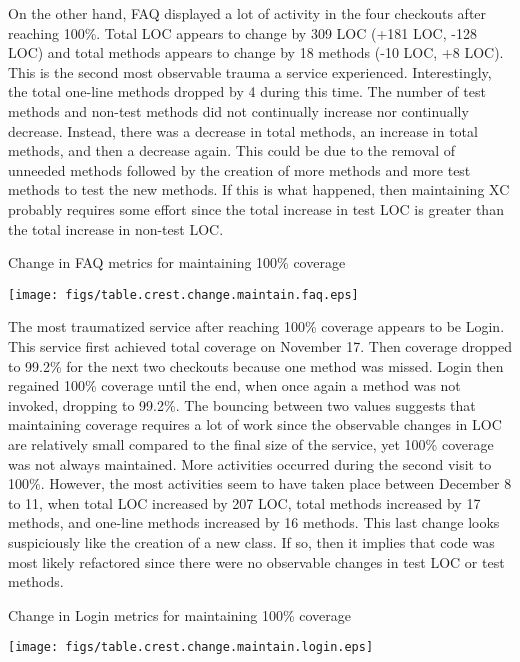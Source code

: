 On the other hand, FAQ displayed a lot of activity in the four checkouts
after reaching 100\%.  Total LOC appears to change by 309 LOC (+181 LOC,
-128 LOC) and total methods appears to change by 18 methods (-10 LOC, +8
LOC).  This is the second most observable trauma a service experienced.
Interestingly, the total one-line methods dropped by 4 during this time.
The number of test methods and non-test methods did not continually
increase nor continually decrease.  Instead, there was a decrease in total
methods, an increase in total methods, and then a decrease again.  This
could be due to the removal of unneeded methods followed by the creation of
more methods and more test methods to test the new methods.  If this is
what happened, then maintaining XC probably requires some effort since the
total increase in test LOC is greater than the total increase in non-test
LOC.

\begin{table}[htbp]
  \begin{center}
    \caption{Change in FAQ metrics for maintaining 100\% coverage}
    \texttt{[image: figs/table.crest.change.maintain.faq.eps]}
  \end{center}
\end{table}

The most traumatized service after reaching 100\% coverage appears to be
Login.  This service first achieved total coverage on November 17.  Then
coverage dropped to 99.2\% for the next two checkouts because one method
was missed.  Login then regained 100\% coverage until the end, when once
again a method was not invoked, dropping to 99.2\%.  The bouncing between
two values suggests that maintaining coverage requires a lot of work since
the observable changes in LOC are relatively small compared to the final
size of the service, yet 100\% coverage was not always maintained.  More
activities occurred during the second visit to 100\%.  However, the most
activities seem to have taken place between December 8 to 11, when total
LOC increased by 207 LOC, total methods increased by 17 methods, and
one-line methods increased by 16 methods.  This last change looks
suspiciously like the creation of a new class.  If so, then it implies that
code was most likely refactored since there were no observable changes in
test LOC or test methods.

\begin{table}[htbp]
  \begin{center}
    \caption{Change in Login metrics for maintaining 100\% coverage}
    \texttt{[image: figs/table.crest.change.maintain.login.eps]}
  \end{center}
\end{table}

